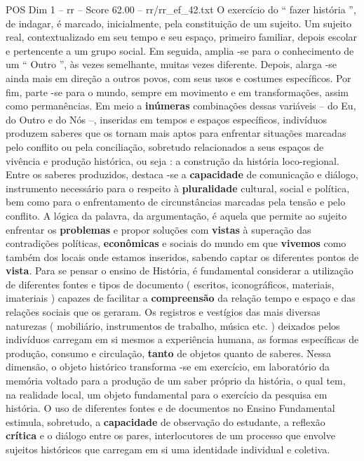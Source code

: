 \begin{textsample}{POS Dim 1 – rr – Score 62.00 – rr/rr\_ef\_42.txt}
O exercício do “ fazer história ”, de indagar, é marcado, inicialmente, pela constituição de um sujeito.
Um sujeito real, contextualizado em seu tempo e seu espaço, primeiro familiar, depois escolar e pertencente a um grupo social.
Em seguida, amplia -se para o conhecimento de um “ Outro ”, às vezes semelhante, muitas vezes diferente.
Depois, alarga -se ainda mais em direção a outros povos, com seus usos e costumes específicos.
Por fim, parte -se para o mundo, sempre em movimento e em transformações, assim como permanências.
Em meio a \textbf{inúmeras} combinações dessas variáveis – do Eu, do Outro e do Nós –, inseridas em tempos e espaços específicos, indivíduos produzem saberes que os tornam mais aptos para enfrentar situações marcadas pelo conflito ou pela conciliação, sobretudo relacionados a seus espaços de vivência e produção histórica, ou seja : a construção da história loco-regional.
Entre os saberes produzidos, destaca -se a \textbf{capacidade} de comunicação e diálogo, instrumento necessário para o respeito à \textbf{pluralidade} cultural, social e política, bem como para o enfrentamento de circunstâncias marcadas pela tensão e pelo conflito.
A lógica da palavra, da argumentação, é aquela que permite ao sujeito enfrentar os \textbf{problemas} e propor soluções com \textbf{vistas} à superação das contradições políticas, \textbf{econômicas} e sociais do mundo em que \textbf{vivemos} como também dos locais onde estamos inseridos, sabendo captar os diferentes pontos de \textbf{vista}.
Para se pensar o ensino de História, é fundamental considerar a utilização de diferentes fontes e tipos de documento ( escritos, iconográficos, materiais, imateriais ) capazes de facilitar a \textbf{compreensão} da relação tempo e espaço e das relações sociais que os geraram.
Os registros e vestígios das mais diversas naturezas ( mobiliário, instrumentos de trabalho, música etc. ) deixados pelos indivíduos carregam em si mesmos a experiência humana, as formas específicas de produção, consumo e circulação, \textbf{tanto} de objetos quanto de saberes.
Nessa dimensão, o objeto histórico transforma -se em exercício, em laboratório da memória voltado para a produção de um saber próprio da história, o qual tem, na realidade local, um objeto fundamental para o exercício da pesquisa em história.
O uso de diferentes fontes e de documentos no Ensino Fundamental estimula, sobretudo, a \textbf{capacidade} de observação do estudante, a reflexão \textbf{crítica} e o diálogo entre os pares, interlocutores de um processo que envolve sujeitos históricos que carregam em si uma identidade individual e coletiva.

\end{textsample}
